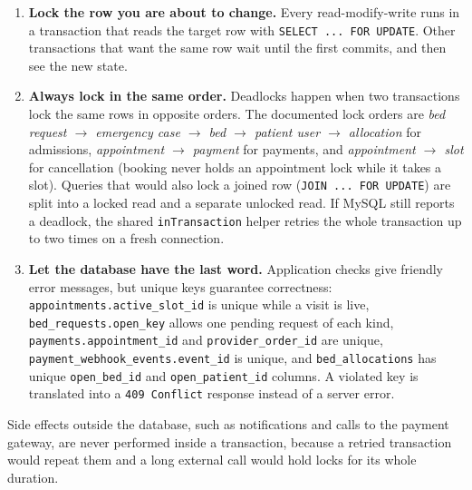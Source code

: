 \begin{enumerate}
    \item \textbf{Lock the row you are about to change.} Every read-modify-write runs in a transaction that reads the target row with \texttt{SELECT ... FOR UPDATE}. Other transactions that want the same row wait until the first commits, and then see the new state.
    \item \textbf{Always lock in the same order.} Deadlocks happen when two transactions lock the same rows in opposite orders. The documented lock orders are \emph{bed request $\rightarrow$ emergency case $\rightarrow$ bed $\rightarrow$ patient user $\rightarrow$ allocation} for admissions, \emph{appointment $\rightarrow$ payment} for payments, and \emph{appointment $\rightarrow$ slot} for cancellation (booking never holds an appointment lock while it takes a slot). Queries that would also lock a joined row (\texttt{JOIN ... FOR UPDATE}) are split into a locked read and a separate unlocked read. If MySQL still reports a deadlock, the shared \texttt{inTransaction} helper retries the whole transaction up to two times on a fresh connection.
    \item \textbf{Let the database have the last word.} Application checks give friendly error messages, but unique keys guarantee correctness: \texttt{appointments.active\_slot\_id} is unique while a visit is live, \texttt{bed\_requests.open\_key} allows one pending request of each kind, \texttt{payments.appointment\_id} and \texttt{provider\_order\_id} are unique, \texttt{payment\_webhook\_events.event\_id} is unique, and \texttt{bed\_allocations} has unique \texttt{open\_bed\_id} and \texttt{open\_patient\_id} columns. A violated key is translated into a \texttt{409 Conflict} response instead of a server error.
\end{enumerate}

Side effects outside the database, such as notifications and calls to the payment gateway, are never performed inside a transaction, because a retried transaction would repeat them and a long external call would hold locks for its whole duration.
